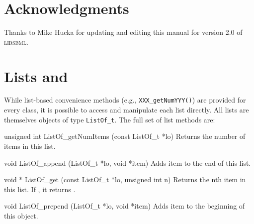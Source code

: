 \documentclass{sbmlmanual}
\newcommand{\libsbml}{\textsc{libsbml}}
\begin{document}


\section{Acknowledgments}
\label{sec:acknowledgments}

Thanks to Mike Hucka for updating and editing this manual for version 2.0
of \libsbml{}.



\clearpage
\appendix
\section{Lists and }
\label{app:lists}

While list-based convenience methods (e.g., \texttt{XXX\_getNumYYY()}) are
provided for every class, it is possible to access and manipulate each list
directly.  All lists are themselves objects of type \texttt{ListOf\_t}.
The full set of list methods are:


\begin{methoddef}{unsigned int ListOf\_getNumItems (const ListOf\_t *lo)}
  Returns the number of items in this list.
\end{methoddef}


\begin{methoddef}{void ListOf\_append (ListOf\_t *lo, void *item)}
  Adds item to the end of this list.
\end{methoddef}


\begin{methoddef}{void * ListOf\_get (const ListOf\_t *lo, unsigned int n)}
  Returns the nth item in this list.  If ,
  it returns .
\end{methoddef}


\begin{methoddef}{void ListOf\_prepend (ListOf\_t *lo, void *item)}
  Adds item to the beginning of this  object.
\end{methoddef}
\end{document}
